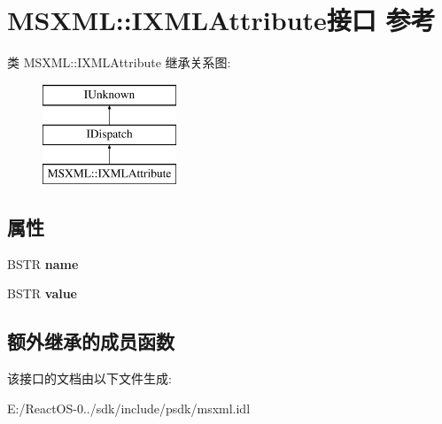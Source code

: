 \hypertarget{interface_m_s_x_m_l_1_1_i_x_m_l_attribute}{}\section{M\+S\+X\+ML\+:\+:I\+X\+M\+L\+Attribute接口 参考}
\label{interface_m_s_x_m_l_1_1_i_x_m_l_attribute}
类 M\+S\+X\+ML\+:\+:I\+X\+M\+L\+Attribute 继承关系图\+:\begin{figure}[H]
\begin{center}
\leavevmode
\includegraphics[height=3.000000cm]{interface_m_s_x_m_l_1_1_i_x_m_l_attribute}
\end{center}
\end{figure}
\subsection*{属性}
\begin{DoxyCompactItemize}
\item 
\mbox{\label{interface_m_s_x_m_l_1_1_i_x_m_l_attribute_ad5ccabb935fdedb4ba211b9bd81d35fc}} 
B\+S\+TR {\bfseries name}
\item 
\mbox{\label{interface_m_s_x_m_l_1_1_i_x_m_l_attribute_abd2a3320ccf8521857855985b86add50}} 
B\+S\+TR {\bfseries value}
\end{DoxyCompactItemize}
\subsection*{额外继承的成员函数}


该接口的文档由以下文件生成\+:\begin{DoxyCompactItemize}
\item 
E\+:/\+React\+O\+S-\/0../sdk/include/psdk/msxml.\+idl\end{DoxyCompactItemize}
